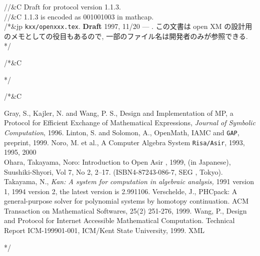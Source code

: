 \documentclass{article}
\begin{document}
\bigbreak


\newpage
\tableofcontents
\newpage
\def\noroa#1{  }
\def\remove#1{ }

//&C \noindent Draft for protocol version 1.1.3.  \\
//&C 1.1.3 is encoded as 001001003 in mathcap. \\


/*&jp
{\tt kxx/openxxx.tex}. {\bf Draft} 1997, 11/20 --- .
この文書は open XM の設計用のメモとしての役目もあるので,
一部のファイル名は開発者のみが参照できる.
*/

/*&C
















%

*/

/*&C

\begin{thebibliography}{99}
Gray, S., Kajler, N. and Wang, P. S.,
Design and Implementation of MP, a Protocol for Efficient
  Exchange of Mathematical Expressions,
  {\sl Journal of Symbolic Computation}, 1996.
Linton, S. and Solomon, A.,
OpenMath, IAMC and {\tt GAP},
preprint, 1999.
Noro, M. et al.,
A Computer Algebra System {\tt Risa/Asir},  1993, 1995, 2000\\
  
     \rm
{}  Ohara, Takayama, Noro: Introduction to Open Asir , 
1999, (in Japanese),
Suushiki-Shyori, Vol 7, No 2, 2--17. (ISBN4-87243-086-7, SEG , Tokyo).
Takayama, N.,
{\em Kan: A system for computation in
algebraic analysis,} 1991 version 1,
1994 version 2, the latest version is 2.991106.
Verschelde, J.,
PHCpack: A general-purpose solver for polynomial systems by
homotopy continuation.  ACM Transaction on Mathematical Softwares, 25(2)
251-276, 1999.
Wang, P.,
Design and Protocol for Internet Accessible Mathematical Computation.
Technical Report ICM-199901-001, ICM/Kent State University, 1999.
XML
\end{thebibliography}
*/
\end{document}
